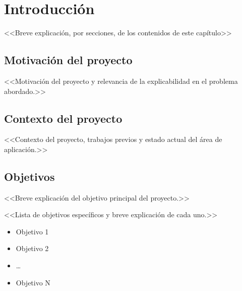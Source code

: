 \chapter{Introducción} \label{chp:intro}

<<Breve explicación, por secciones, de los contenidos de este capítulo>>


\section{Motivación del proyecto} \label{sct:intro:motivacion}

<<Motivación del proyecto y relevancia de la explicabilidad en el problema abordado.>>


\section{Contexto del proyecto} \label{sct:intro:contexto}

<<Contexto del proyecto, trabajos previos y estado actual del área de aplicación.>>


\section{Objetivos} \label{sct:intro:objetivos}

<<Breve explicación del objetivo principal del proyecto.>>

<<Lista de objetivos específicos y breve explicación de cada uno.>>

\begin{itemize}

    \item[•] Objetivo 1

    \item[•] Objetivo 2

    \item[•] \ldots

    \item[•] Objetivo N

\end{itemize}


